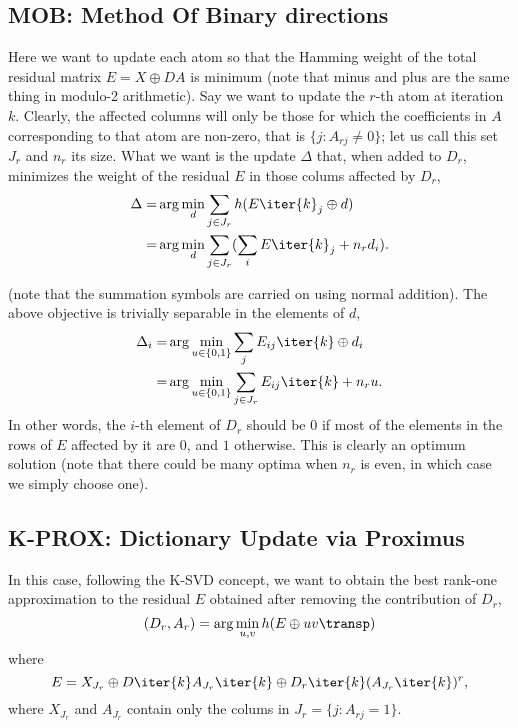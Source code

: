 \documentclass[a4paper]{IEEEtran}
\begin{document}
\subsection{MOB: Method Of Binary directions}
 
Here we want to update each atom so that the Hamming weight of the total residual matrix $E = X \oplus DA$ is minimum (note that minus and plus are the same thing in modulo-2 arithmetic). Say we want to update the $r$-th atom at iteration $k$. Clearly, the affected columns will only be those for which the  coefficients in $A$  corresponding to that atom are non-zero, that is $\{j : A_{rj} \neq 0 \}$; let us call this set $J_r$ and $n_r$ its size. What we want is the update $\Delta$ that, when added to $D_r$, minimizes the weight of the residual $E$ in those colums affected by $D_r$,
 \begin{eqnarray}
 \Delta  =& \arg\min_d \sum_{j \in J_r}  h(E\iter{k}_j \oplus d) \\
 =& \arg\min_d \sum_{j \in J_r} (\sum_i E\iter{k}_j + n_r d_i).
\label{eq:mob1}
 \end{eqnarray}

(note that the summation symbols are carried on using normal addition). The above objective is trivially separable in the elements of $d$,
 \begin{eqnarray}
 \Delta_i  =& \arg\min_{u \in \{0,1\}} \sum_j E_{ij}\iter{k} \oplus d_i\\
 =& \arg\min_{u \in \{0,1\}} \sum_{j\in J_r} E_{ij}\iter{k} + n_r u.
\label{eq:mob2}
 \end{eqnarray}
In other words, the $i$-th element of $D_r$ should be $0$ if most of the elements in the rows of $E$ affected by it are $0$, and $1$ otherwise. 
This is clearly an optimum solution (note that there could be many optima  when $n_r$ is even, in which case we simply choose one).

\subsection{K-PROX: Dictionary Update via Proximus}

In this case, following the K-SVD concept, we want to obtain the best rank-one approximation to the residual $E$ obtained after removing the contribution of $D_r$, 
\begin{equation}
(D_r,A_r) = \arg\min_{u,v} h(E \oplus uv\transp)
\label{eq:bsvd1}
\end{equation}
where
\begin{equation}
E =  X_{J_r} \oplus D\iter{k}A_{J_r}\iter{k} \oplus D_r\iter{k}(A_{J_r}\iter{k})^r,
\label{eq:bsvd2}
\end{equation}
where $X_{J_r}$ and $A_{J_r}$ contain only the colums in $J_r = \{j: A_{rj} = 1 \}$.
\end{document}
